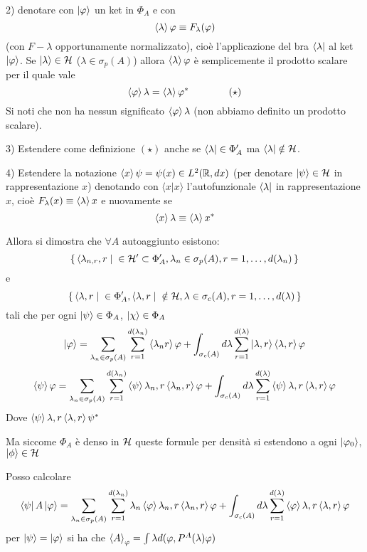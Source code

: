 \documentclass[../../FisicaTeorica.tex]{subfiles}
\begin{document}
2) denotare con $\ket\varphi$ un ket in $\Phi_A$ e con
\[
\braket{\lambda}{\varphi} \equiv F_\lambda (\varphi)
\]
(con $F-\lambda$ opportunamente normalizzato), cioè l'applicazione del bra $\bra\lambda$ al ket $\ket\varphi$.
Se $\ket\lambda \in \mathcal{H}$ ($\lambda \in \sigma_p(A)$) allora $\braket{\lambda}{\varphi}$ è semplicemente il prodotto scalare per il quale vale
\[
\braket{\varphi}{\lambda} = \braket{\lambda}{\varphi}^* \qquad \qquad (\star)
\]
Si noti che non ha nessun significato $\braket{\varphi}{\lambda}$ (non abbiamo definito un prodotto scalare).

3) Estendere come definizione $(\star)$ anche se $\bra\lambda \in \Phi'_A$ ma $\bra\lambda \notin \mathcal{H}$.

4) Estendere la notazione $\braket{x}{\psi} = \psi(x) \in L^2(\mathbb R, d x)$ (per denotare $\ket\psi \in \mathcal{H}$ in rappresentazione $x$) denotando con $\langle{x}|{x}\rangle$ l'autofunzionale $\bra{\lambda}$ in rappresentazione $x$, cioè $F_\lambda(x) \equiv \braket{\lambda}{x}$ e nuovamente se 
\[
\braket{x}{\lambda} \equiv \braket{\lambda}{x}^*
\]

Allora si dimostra che $\forall A$ autoaggiunto esistono:
\[
\set{\bra{\lambda_{n,r},r} \in \mathcal{H}' \subset \Phi'_A, \lambda_n \in \sigma_p(A), r = 1,\dots,d(\lambda_n)}
\]
e
\[
\set{\bra{\lambda,r} \in \Phi'_A, \bra{\lambda,r} \notin \mathcal{H}, \lambda \in \sigma_c(A), r = 1, \dots, d(\lambda)}
\]
tali che per ogni $\ket\psi \in \Phi_A$, $\ket\chi \in \Phi_A$
\[
\ket\varphi = \sum_{\lambda_n \in \sigma_p(A)} \sum_{r = 1}^{d(\lambda_n)} \braket{\lambda_n r}{\varphi} + \int_{\sigma_c(A)} d\lambda \sum_{r = 1}^{d(\lambda)} {\ket{\lambda,r} \braket{\lambda,r}{\varphi}}
\]
\[
\braket{\psi}{\varphi} = \sum_{\lambda_n \in \sigma_p(A)} \sum_{r = 1}^{d(\lambda_n)} \braket{\psi}{\lambda_n, r} \braket{\lambda_n, r}{\varphi} + \int_{\sigma_c(A)} d\lambda \sum_{r = 1}^{d(\lambda)} \braket{\psi}{\lambda,r} \braket{\lambda,r}{\varphi}
\]
Dove $\braket{\psi}{\lambda,r} \braket{\lambda,r}{\psi}^*$

Ma siccome $\Phi_A$ è denso in $\mathcal{H}$ queste formule per densità si estendono a ogni $\ket{\varphi_0}$, $\ket\phi \in \mathcal{H}$

Posso calcolare
\[
\bra\psi A \ket\varphi = \sum_{\lambda_n \in \sigma_p(A)} \sum_{r = 1}^{d(\lambda_n)} \lambda_n \braket{\varphi}{\lambda_n, r} \braket{\lambda_n, r}{\varphi} + \int_{\sigma_c(A)} d\lambda \sum_{r = 1}^{d(\lambda)} \braket{\varphi}{\lambda,r} \braket{\lambda,r}{\varphi}
\]
per $\ket\psi = \ket\varphi$ si ha che $\left\langle{A}\right\rangle_\varphi = \int \lambda d (\varphi, P^A(\lambda) \varphi)$
\end{document}
